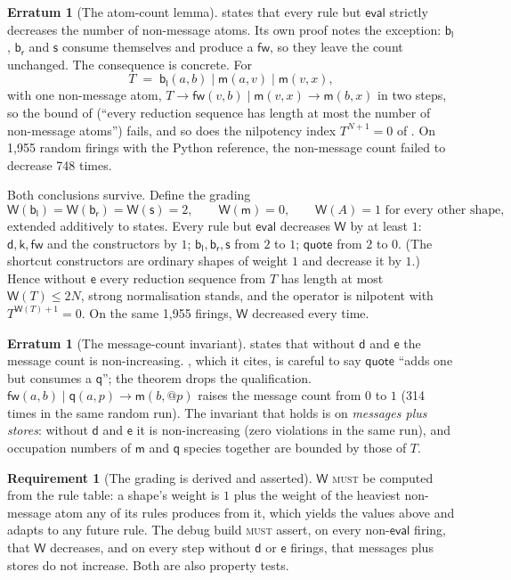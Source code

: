 \documentclass[11pt,a4paper]{article}
\makeatletter
\newcommand{\MUST}{\textsc{must}}
\newcommand{\quo}[1]{@#1}
\newcommand{\red}{\longrightarrow}
\newcommand{\mm}{\mathsf{m}}
\newcommand{\dd}{\mathsf{d}}
\newcommand{\kk}{\mathsf{k}}
\newcommand{\fw}{\mathsf{fw}}
\newcommand{\bl}{\mathsf{b}_{\mathsf{l}}}
\newcommand{\br}{\mathsf{b}_{\mathsf{r}}}
\newcommand{\sy}{\mathsf{s}}
\newcommand{\ev}{\mathsf{e}}
\newcommand{\qq}{\mathsf{q}}
\newcommand{\Wt}{\mathsf{W}}
\theoremstyle{definition}
\newtheorem{requirement}[definition]{Requirement}
\newtheorem{erratum}[definition]{Erratum}
\theoremstyle{plain}
\makeatother
\begin{document}
\begin{erratum}[The atom-count lemma]\label{err:atomcount}
\cite[Lem.~9.2]{draft3} states that every rule but $\mathsf{eval}$ strictly
decreases the number of non-message atoms. Its own proof notes the exception:
$\bl$, $\br$ and $\sy$ consume themselves and produce a $\fw$, so they leave
the count unchanged. The consequence is concrete. For
\[
T \;=\; \bl(a,b) \mid \mm(a,v) \mid \mm(v,x),
\]
with one non-message atom, $T \red \fw(v,b) \mid \mm(v,x) \red \mm(b,x)$ in
two steps, so the bound of \cite[Prop.~9.9]{draft3} (``every reduction
sequence has length at most the number of non-message atoms'') fails, and so
does the nilpotency index $T^{N+1} = 0$ of \cite[Thm.~6.1(ii)]{matnote}. On
1{,}955 random firings with the Python reference, the non-message count failed
to decrease 748 times.

Both conclusions survive. Define the grading
\[
\Wt(\bl) = \Wt(\br) = \Wt(\sy) = 2,\qquad \Wt(\mm) = 0,\qquad
\Wt(A) = 1 \text{ for every other shape},
\]
extended additively to states. Every rule but $\mathsf{eval}$ decreases
$\Wt$ by at least $1$: $\dd,\kk,\fw$ and the constructors by $1$;
$\bl,\br,\sy$ from $2$ to $1$; $\mathsf{quote}$ from $2$ to $0$. (The
shortcut constructors are ordinary shapes of weight $1$ and decrease it by
$1$.) Hence without $\ev$ every reduction sequence from $T$ has length at
most $\Wt(T) \le 2N$, strong normalisation stands, and the operator is
nilpotent with $T^{\Wt(T)+1} = 0$. On the same 1{,}955 firings, $\Wt$
decreased every time.
\end{erratum}

\begin{erratum}[The message-count invariant]\label{err:msgcount}
\cite[Thm.~6.1(iii)]{matnote} states that without $\dd$ and $\ev$ the message
count is non-increasing. \cite[Lem.~9.3]{draft3}, which it cites, is careful
to say $\mathsf{quote}$ ``adds one but consumes a $\qq$''; the theorem drops
the qualification. $\fw(a,b) \mid \qq(a,p) \red \mm(b,\quo{p})$ raises the
message count from $0$ to $1$ (314 times in the same random run). The
invariant that holds is on \emph{messages plus stores}: without $\dd$ and
$\ev$ it is non-increasing (zero violations in the same run), and occupation
numbers of $\mm$ and $\qq$ species together are bounded by those of $T$.
\end{erratum}

\begin{requirement}[The grading is derived and asserted]\label{req:grading}
$\Wt$ \MUST{} be computed from the rule table: a shape's weight is $1$ plus
the weight of the heaviest non-message atom any of its rules produces from
it, which yields the values above and adapts to any future rule. The debug
build \MUST{} assert, on every non-$\mathsf{eval}$ firing, that $\Wt$
decreases, and on every step without $\dd$ or $\ev$ firings, that messages
plus stores do not increase. Both are also property tests.
\end{requirement}
\end{document}
